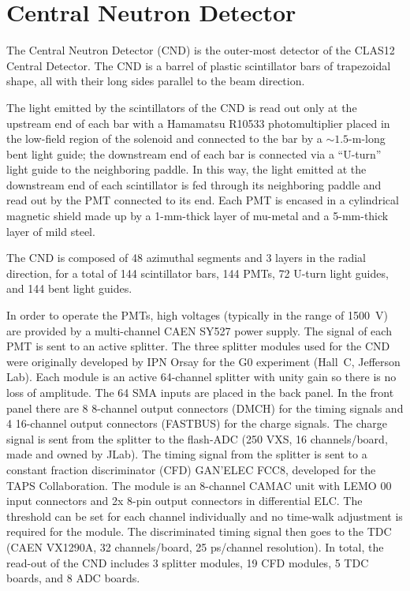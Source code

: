 \section{Central Neutron Detector}

The Central Neutron Detector (CND) is the outer-most detector of the CLAS12 Central
Detector. The CND is a barrel of plastic scintillator bars of trapezoidal shape, all 
with their long sides parallel to the beam direction. 

The light emitted by the scintillators of the CND is read out only at the upstream end of each 
bar with a Hamamatsu R10533 photomultiplier placed in the low-field region of the solenoid 
and connected to the bar by a $\sim 1.5$-m-long bent light guide; the downstream end of each 
bar is connected via a ``U-turn'' light guide to the neighboring paddle. In this way, the 
light emitted at the downstream end of each scintillator is fed through its neighboring 
paddle and read out by the PMT connected to its end. Each PMT is encased in a cylindrical 
magnetic shield made up by a 1-mm-thick layer of mu-metal and a 5-mm-thick layer of mild steel. 

The CND is composed of 48 azimuthal segments and 3 layers in the radial direction, for a total 
of 144 scintillator bars, 144 PMTs, 72 U-turn light guides, and 144 bent light guides. 

In order to operate the PMTs, high voltages (typically in the range of 1500~V) are provided  
by a multi-channel CAEN SY527 power supply. The signal of each PMT is sent to an active splitter. 
The three splitter modules used for the CND were originally developed by IPN Orsay for the G0 
experiment (Hall~C, Jefferson Lab). Each module is an active 64-channel splitter with unity gain 
so there is no loss of amplitude. The 64 SMA inputs are placed in the back panel. In the front 
panel there are 8 8-channel output connectors (DMCH) for the timing signals and 4 16-channel 
output connectors (FASTBUS) for the charge signals. The charge signal is sent from the splitter 
to the flash-ADC (250 VXS, 16 channels/board, made and owned by JLab). The timing signal from 
the splitter is sent to a constant fraction discriminator (CFD) GAN'ELEC FCC8, developed for the 
TAPS Collaboration. The module is an 8-channel CAMAC unit with LEMO 00 input connectors and 2x 
8-pin output connectors in differential ELC. The threshold can be set for each channel 
individually and no time-walk adjustment is required for the module. The discriminated timing 
signal then goes to the TDC (CAEN VX1290A, 32 channels/board, 25 ps/channel resolution). In total, 
the read-out of the CND includes 3 splitter modules, 19 CFD modules, 5 TDC boards, and 8 ADC 
boards. 

